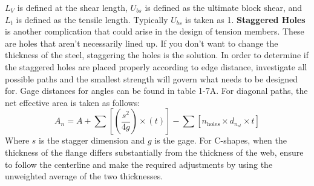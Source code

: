 \documentclass{article}
\begin{document}
$L_V$ is defined at the shear length, $U_{bs}$ is defined as the ultimate block shear, and $L_t$ is defined as the tensile length. Typically $U_{bs}$ is taken as 1. \textbf{Staggered Holes} is another complication that could arise in the design of tension members. These are holes that aren't necessarily lined up. If you don't want to change the thickness of the steel, staggering the holes is the solution. In order to determine if the staggered holes are placed properly according to edge distance, investigate all possible paths and the smallest strength will govern what needs to be designed for. Gage distances for angles can be found in table 1-7A. For diagonal paths, the net effective area is taken as follows: 
\[A_n=A+\sum\left[\left(\frac{s^2}{4g}\right)\times(t)\right]-\sum\left[ n_\text{holes}\times d_{n_{st}}\times t\right]\] 
Where $s$ is the stagger dimension and $g$ is the gage. For C-shapes, when the thickness of the flange differs substantially from the thickness of the web, ensure to follow the centerline and make the required adjustments by using the unweighted average of the two thicknesses.
\end{document}

